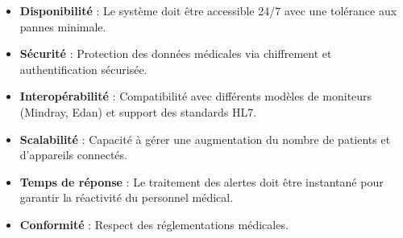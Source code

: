 \begin{itemize}
    \item \textbf{Disponibilité} : Le système doit être accessible 24/7 avec une tolérance aux pannes minimale.
    \item \textbf{Sécurité} : Protection des données médicales via chiffrement et authentification sécurisée.
    \item \textbf{Interopérabilité} : Compatibilité avec différents modèles de moniteurs (Mindray, Edan) et support des standards HL7.
    \item \textbf{Scalabilité} : Capacité à gérer une augmentation du nombre de patients et d’appareils connectés.
    \item \textbf{Temps de réponse} : Le traitement des alertes doit être instantané pour garantir la réactivité du personnel médical.
    \item \textbf{Conformité} : Respect des réglementations médicales.
\end{itemize}
